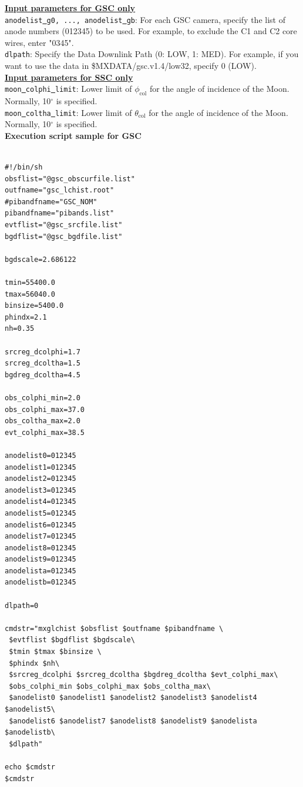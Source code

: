\documentclass[10pt]{report}
\renewcommand{\_}{\textscale{.5}{\textbf{\textunderscore}}}
\begin{document}
\noindent\underline{\textbf{Input parameters for GSC only}} \\

\noindent \texttt{anodelist\underline{ }g0, .\!.\!., anodelist\underline{ }gb}: For each GSC camera, specify the list of anode numbers (012345) to be used. For example, to exclude the C1 and C2 core wires, enter "0345". \\

\noindent \texttt{dlpath}: Specify the Data Downlink Path (0: LOW, 1: MED). For example, if you want to use the data in \$MXDATA/gsc.v1.4/low32, specify 0 (LOW).\\

\noindent\underline{\textbf{Input parameters for SSC only}} \\

\noindent\texttt{moon\underline{ }colphi\underline{ }limit}: Lower limit of $\phi_{\text{col}}$ for the angle of incidence of the Moon. Normally, 10$^{\circ}$ is specified. \\

\noindent\texttt{moon\underline{ }coltha\underline{ }limit}: Lower limit of $\theta_{\text{col}}$ for the angle of incidence of the Moon. Normally, 10$^{\circ}$ is specified. \\

\noindent\textbf{Execution script sample for GSC} \\

\begin{lstlisting}[frame=single]

#!/bin/sh
obsflist="@gsc_obscurfile.list"
outfname="gsc_lchist.root"
#pibandfname="GSC_NOM"
pibandfname="pibands.list"
evtflist="@gsc_srcfile.list"
bgdflist="@gsc_bgdfile.list"

bgdscale=2.686122

tmin=55400.0
tmax=56040.0
binsize=5400.0
phindx=2.1
nh=0.35

srcreg_dcolphi=1.7
srcreg_dcoltha=1.5
bgdreg_dcoltha=4.5

obs_colphi_min=2.0
obs_colphi_max=37.0
obs_coltha_max=2.0
evt_colphi_max=38.5

anodelist0=012345
anodelist1=012345
anodelist2=012345
anodelist3=012345
anodelist4=012345
anodelist5=012345
anodelist6=012345
anodelist7=012345
anodelist8=012345
anodelist9=012345
anodelista=012345
anodelistb=012345

dlpath=0

cmdstr="mxglchist $obsflist $outfname $pibandfname \
 $evtflist $bgdflist $bgdscale\
 $tmin $tmax $binsize \
 $phindx $nh\
 $srcreg_dcolphi $srcreg_dcoltha $bgdreg_dcoltha $evt_colphi_max\
 $obs_colphi_min $obs_colphi_max $obs_coltha_max\
 $anodelist0 $anodelist1 $anodelist2 $anodelist3 $anodelist4 $anodelist5\
 $anodelist6 $anodelist7 $anodelist8 $anodelist9 $anodelista $anodelistb\
 $dlpath"

echo $cmdstr
$cmdstr

\end{lstlisting}
\end{document}
